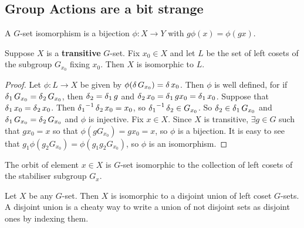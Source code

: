 \subsection*{Group Actions are a bit strange}
A $G$-set isomorphism is a bijection $\phi:X \to Y$ with $g\phi(x) = \phi(gx)$.
\begin{theorem}
Suppose $X$ is a \textbf{transitive} $G$-set. Fix $x_0 \in X$ and let $L$ be the set of left cosets of the subgroup $G_{x_0}$ fixing $x_0$.
Then $X$ is isomorphic to $L$.
\end{theorem}
\begin{proof}
Let $\phi: L \to X$ be given by $\phi(\operatorname{\delta} G_{x_0}) = \operatorname{\delta} x_0$. Then $\phi$ is well defined, for if
$\operatorname{\delta}_1 G_{x_0} = \operatorname{\delta}_2 G_{x_0}$, then $\operatorname{\delta}_2 = \operatorname{\delta}_1 g$ and $\operatorname{\delta}_2 x_0 = \operatorname{\delta}_1 g x_0 = \operatorname{\delta}_1 x_0$.
Suppose that $\operatorname{\delta}_1 x_0 = \operatorname{\delta}_2 x_0$. Then ${\operatorname{\delta}_1}^{-1}\operatorname{\delta}_2 x_0 = x_0$, so ${\operatorname{\delta}_1}^{-1}\operatorname{\delta}_2 \in G_{x_0}$. So $\operatorname{\delta}_2 \in \operatorname{\delta}_1 G_{x_0}$ and $ \operatorname{\delta}_1 G_{x_0} =  \operatorname{\delta}_2 G_{x_0}$ and $\phi$ is injective.
Fix $x \in X$. Since $X$ is transitive, $\exists g \in G$ such that $gx_0 = x$ so that $\phi(gG_{x_0}) = gx_0 = x$, so $\phi$ is a bijection. It is easy to see that $g_1\phi(g_2G_{x_0}) = \phi(g_1g_2G_{x_0})$, so $\phi$ is an isomorphism.
\end{proof}
\begin{cor}
The orbit of element $x \in X$ is $G$-set isomorphic to the collection of
left cosets of the stabiliser subgroup $G_x$.
\end{cor}
\begin{theorem}
Let $X$ be any $G$-set. Then $X$ is  isomorphic to a disjoint union of left coset $G$-sets.
A disjoint union is a cheaty way to write a union of not disjoint sets as disjoint ones by indexing them.
\end{theorem}

